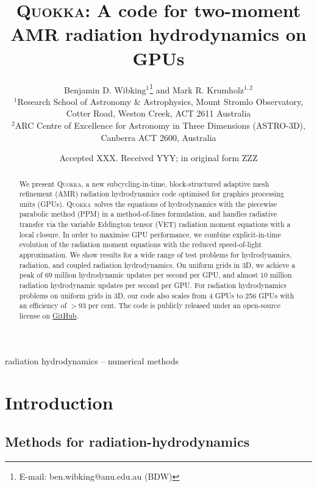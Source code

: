 \documentclass[fleqn,usenatbib]{mnras}
\title[Two-moment AMR radiation hydrodynamics on GPUs]{\textsc{Quokka}: A code for two-moment AMR radiation hydrodynamics on GPUs}
\author[B. D. Wibking et al.]{
    Benjamin D. Wibking$^{1}$\thanks{E-mail: ben.wibking@anu.edu.au (BDW)}
    and Mark R. Krumholz$^{1,2}$
\\
$^{1}$Research School of Astronomy \& Astrophysics, Mount Stromlo Observatory, Cotter Road, Weston Creek, ACT 2611 Australia\\
$^{2}$ARC Centre of Excellence for Astronomy in Three Dimensions (ASTRO-3D), Canberra ACT 2600, Australia
}
\date{Accepted XXX. Received YYY; in original form ZZZ}
\newcommand{\quokka}{\textsc{Quokka}}
\begin{document}
\label{firstpage}
\pagerange{\pageref{firstpage}--\pageref{lastpage}}
\maketitle

\begin{abstract}
    We present \quokka, a new subcycling-in-time, block-structured adaptive mesh refinement (AMR) radiation hydrodynamics code optimised for graphics processing units (GPUs). \quokka~solves the equations of hydrodynamics with the piecewise parabolic method (PPM) in a method-of-lines formulation, and handles radiative transfer via the variable Eddington tensor (VET) radiation moment equations with a local closure. In order to maximise GPU performance, we combine explicit-in-time evolution of the radiation moment equations with the reduced speed-of-light approximation. We show results for a wide range of test problems for hydrodynamics, radiation, and coupled radiation hydrodynamics. On uniform grids in 3D, we achieve a peak of $69$ million hydrodynamic updates per second per GPU, and almost 10 million radiation hydrodynamic updates per second per GPU. For radiation hydrodynamics problems on uniform grids in 3D, our code also scales from 4 GPUs to 256 GPUs with an efficiency of $>93$ per cent. The code is publicly released under an open-source license on \faGithub\href{https://github.com/BenWibking/quokka-code}{GitHub}.
\end{abstract}

\begin{keywords}
radiation hydrodynamics -- numerical methods
\end{keywords}



\section{Introduction}


\subsection{Methods for radiation-hydrodynamics}
\end{document}
